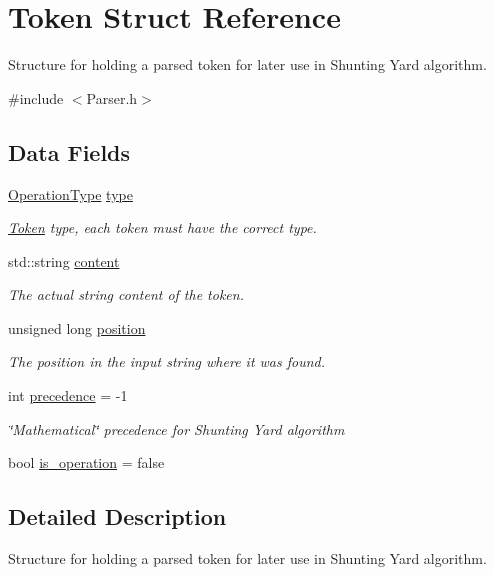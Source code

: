 \hypertarget{structToken}{}\section{Token Struct Reference}
\label{structToken}


Structure for holding a parsed token for later use in Shunting Yard algorithm.  




{\ttfamily \#include $<$Parser.\+h$>$}

\subsection*{Data Fields}
\begin{DoxyCompactItemize}
\item 
\hyperlink{Parser_8h_a9a2c9c31d675b34f6ec35cc1ca89e047}{Operation\+Type} \hyperlink{structToken_a789b6f0ef869794e8edeaff2d1f67cc5}{type}
\begin{DoxyCompactList}\small\item\em \hyperlink{structToken}{Token} type, each token must have the correct type. \end{DoxyCompactList}\item 
std\+::string \hyperlink{structToken_a0e29f6b35c314683c1a4729eb0d08739}{content}
\begin{DoxyCompactList}\small\item\em The actual string content of the token. \end{DoxyCompactList}\item 
unsigned long \hyperlink{structToken_ab8ddfabb4f48684b2ff8620948e12fcc}{position}
\begin{DoxyCompactList}\small\item\em The position in the input string where it was found. \end{DoxyCompactList}\item 
int \hyperlink{structToken_adafb834c6a6e9e4ce4b0bf709f0b2bac}{precedence} = -\/1
\begin{DoxyCompactList}\small\item\em \char`\"{}\+Mathematical\char`\"{} precedence for Shunting Yard algorithm \end{DoxyCompactList}\item 
bool \hyperlink{structToken_a45a4e04f11c31ab263bd5be4546f6fc1}{is\+\_\+operation} = false
\end{DoxyCompactItemize}


\subsection{Detailed Description}
Structure for holding a parsed token for later use in Shunting Yard algorithm. 

